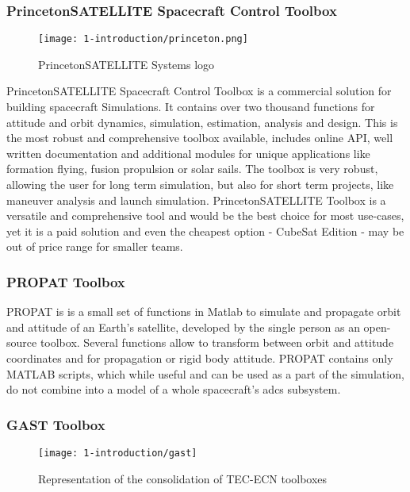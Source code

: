     \subsubsection{PrincetonSATELLITE Spacecraft Control Toolbox}
        \begin{figure}[H]
            \centering
            \texttt{[image: 1-introduction/princeton.png]}
            \caption{PrincetonSATELLITE Systems logo\cite{princetonlogo}}
            \label{fig:princeton}
        \end{figure}
        PrincetonSATELLITE Spacecraft Control Toolbox is a commercial solution for building spacecraft Simulations. It contains over two thousand functions for attitude and orbit dynamics, simulation, estimation, analysis and design. This is the most robust and comprehensive toolbox available, includes online API, well written documentation and additional modules for unique applications like formation flying, fusion propulsion or solar sails. The toolbox is very robust, allowing the user for long term simulation, but also for short term projects, like maneuver analysis and launch simulation. PrincetonSATELLITE Toolbox is a versatile and comprehensive tool and would be the best choice for most use-cases, yet it is a paid solution and even the cheapest option - CubeSat Edition - may be out of price range for smaller teams\cite{princeton}.

    \subsubsection{PROPAT Toolbox}
        PROPAT is is a small set of functions in Matlab to simulate and propagate orbit and attitude of an Earth's satellite, developed by the single person as an open-source toolbox. Several functions allow to transform between orbit and attitude coordinates and for propagation or rigid body attitude. PROPAT contains only MATLAB scripts, which while useful and can be used as a part of the simulation, do not combine into a model of a whole spacecraft's \ac{adcs} subsystem\cite{propat}.

    \subsubsection{GAST Toolbox}
        \begin{figure}[H]
            \centering
            \texttt{[image: 1-introduction/gast]}
            \caption{Representation of the consolidation of TEC-ECN toolboxes}
            \label{fig:gast}
        \end{figure}

